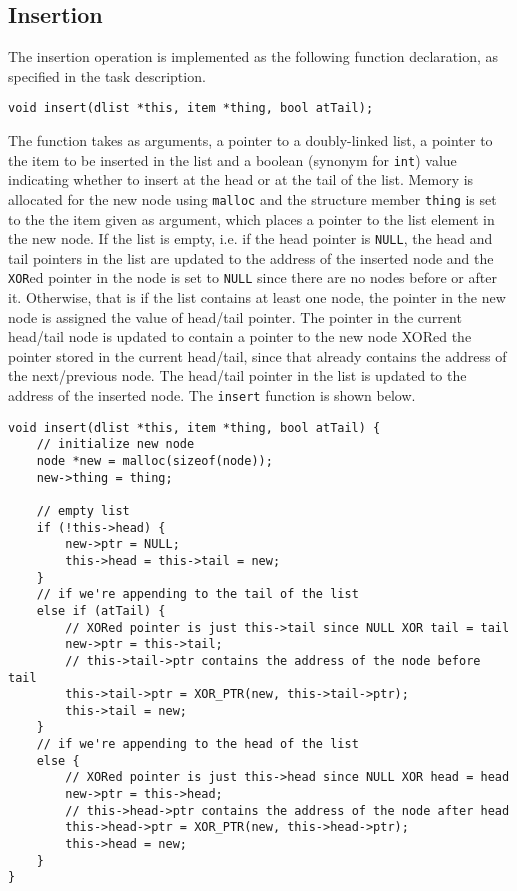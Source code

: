 \documentclass[11pt]{article}
\newcommand{\code}[1]{{\tt #1}}
\begin{document}
\subsection{Insertion}
The insertion operation is implemented as the following function declaration, as
specified in the task description.

\begin{lstlisting}
void insert(dlist *this, item *thing, bool atTail);
\end{lstlisting}

The function takes as arguments, a pointer to a doubly-linked list, a pointer to
the item to be inserted in the list and a boolean (synonym for \code{int}) value
indicating whether to insert at the head or at the tail of the list.
Memory is allocated for the new node using \code{malloc} and the structure
member \code{thing} is set to the the item given as argument, which places a
pointer to the list element in the new node. If the list is empty, i.e. if the
head pointer is \code{NULL}, the head and tail pointers in the list are updated
to the address of the inserted node and the \verb|XOR|ed pointer in the node is set to
\code{NULL} since there are no nodes before or after it. Otherwise, that is if
the list contains at least one node, the pointer in the new node is assigned the
value of head/tail pointer. The pointer in the current head/tail node is updated
to contain a pointer to the new node XORed the pointer stored in the current
head/tail, since that already contains the address of the next/previous node.
The head/tail pointer in the list is updated to the address of the inserted
node. The \code{insert} function is shown below.

\begin{lstlisting}
void insert(dlist *this, item *thing, bool atTail) {
    // initialize new node
    node *new = malloc(sizeof(node));
    new->thing = thing;

    // empty list
    if (!this->head) {
        new->ptr = NULL;
        this->head = this->tail = new;
    }
    // if we're appending to the tail of the list
    else if (atTail) {
        // XORed pointer is just this->tail since NULL XOR tail = tail
        new->ptr = this->tail;
        // this->tail->ptr contains the address of the node before tail
        this->tail->ptr = XOR_PTR(new, this->tail->ptr);
        this->tail = new;
    }
    // if we're appending to the head of the list
    else {
        // XORed pointer is just this->head since NULL XOR head = head
        new->ptr = this->head;
        // this->head->ptr contains the address of the node after head
        this->head->ptr = XOR_PTR(new, this->head->ptr);
        this->head = new;
    }
}
\end{lstlisting}
\end{document}
